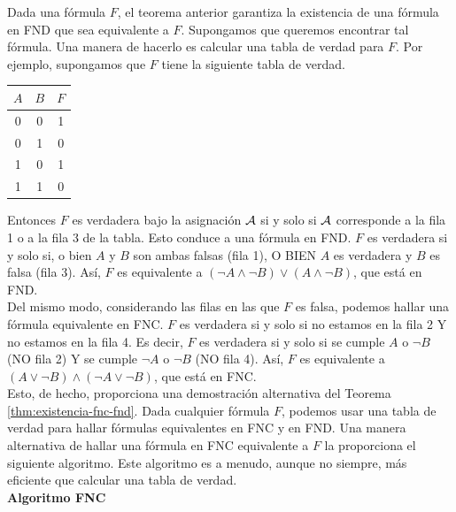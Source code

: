 \message{ !name(main.tex)}\documentclass[12pt,a4paper]{book}
\begin{document}
    Dada una fórmula $F$, el teorema anterior garantiza la existencia de una fórmula en FND que sea equivalente a $F$.
    Supongamos que queremos encontrar tal fórmula. Una manera de hacerlo es calcular una tabla de verdad para $F$. Por
    ejemplo, supongamos que $F$ tiene la siguiente tabla de verdad.

    \begin{center}
    \renewcommand{\arraystretch}{1.5}
    \begin{tabular}{c | c | c}
        $A$ & $B$ & $F$\\
        \hline
        0 & 0 & 1\\
        0 & 1 & 0\\
        1 & 0 & 1\\
        1 & 1 & 0\\
    \end{tabular}
    \end{center}

    Entonces $F$ es verdadera bajo la asignación $\AA$ si y solo si $\AA$ corresponde a la fila 1 o a la fila 3 de la tabla.
    Esto conduce a una fórmula en FND. $F$ es verdadera si y solo si, o bien $A$ y $B$ son ambas falsas (fila 1), O BIEN $A$ es
    verdadera y $B$ es falsa (fila 3). Así, $F$ es equivalente a $(\neg A\wedge\neg B)\vee(A\wedge\neg B)$, que está en FND.\\
    Del mismo modo, considerando las filas en las que $F$ es falsa, podemos hallar una fórmula equivalente en FNC. $F$ es
    verdadera si y solo si no estamos en la fila 2 Y no estamos en la fila 4. Es decir, $F$ es verdadera si y solo si se
    cumple $A$ o $\neg B$ (NO fila 2) Y se cumple $\neg A$ o $\neg B$ (NO fila 4). Así, $F$ es equivalente a
    $(A\vee\neg B)\wedge(\neg A\vee\neg B)$, que está en FNC.\\
    Esto, de hecho, proporciona una demostración alternativa del Teorema \ref{thm:existencia-fnc-fnd}. Dada cualquier fórmula
    $F$, podemos usar una tabla de verdad para hallar fórmulas equivalentes en FNC y en FND. Una manera alternativa de hallar
    una fórmula en FNC equivalente a $F$ la proporciona el siguiente algoritmo. Este algoritmo es a menudo, aunque no siempre,
    más eficiente que calcular una tabla de verdad.\\

    \noindent\textbf{Algoritmo FNC}
\end{document}
